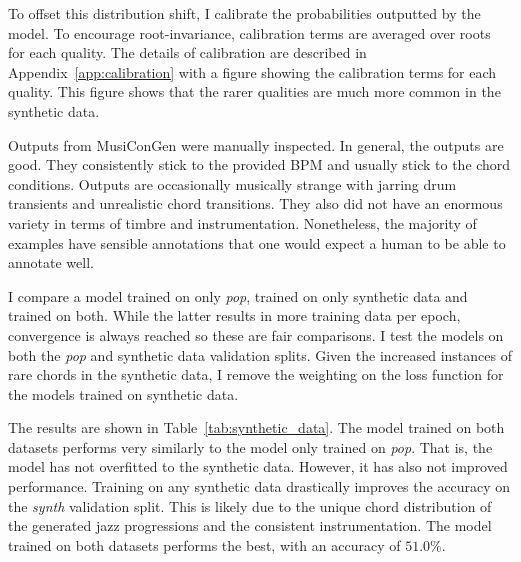 To offset this distribution shift, I calibrate the probabilities outputted by the model. To encourage root-invariance, calibration terms are averaged over roots for each quality. The details of calibration are described in Appendix~\ref{app:calibration} with a figure showing the calibration terms for each quality. This figure shows that the rarer qualities are much more common in the synthetic data.

Outputs from MusiConGen were manually inspected. In general, the outputs are good. They consistently stick to the provided BPM and usually stick to the chord conditions. Outputs are occasionally musically strange with jarring drum transients and unrealistic chord transitions. They also did not have an enormous variety in terms of timbre and instrumentation. Nonetheless, the majority of examples have sensible annotations that one would expect a human to be able to annotate well. 

I compare a model trained on only \emph{pop}, trained on only synthetic data and trained on both. While the latter results in more training data per epoch, convergence is always reached so these are fair comparisons. I test the models on both the \emph{pop} and synthetic data validation splits. Given the increased instances of rare chords in the synthetic data, I remove the weighting on the loss function for the models trained on synthetic data.

The results are shown in Table~\ref{tab:synthetic_data}. The model trained on both datasets performs very similarly to the model only trained on \emph{pop}. That is, the model has not overfitted to the synthetic data. However, it has also not improved performance. Training on any synthetic data drastically improves the accuracy on the \emph{synth} validation split. This is likely due to the unique chord distribution of the generated jazz progressions and the consistent instrumentation. The model trained on both datasets performs the best, with an accuracy of $51.0\%$.

